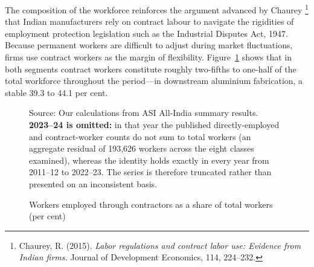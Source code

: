 \documentclass[11pt, a4paper]{article}
\numberwithin{figure}{section}
\numberwithin{table}{section}
\begin{document}
The composition of the workforce reinforces the argument advanced by Chaurey \cite{chaurey2015}\footnote{Chaurey, R. (2015). \textit{Labor regulations and contract labor use: Evidence from Indian firms.} Journal of Development Economics, 114, 224--232.} that Indian manufacturers rely on contract labour to navigate the rigidities of employment protection legislation such as the Industrial Disputes Act, 1947. Because permanent workers are difficult to adjust during market fluctuations, firms use contract workers as the margin of flexibility. Figure~\ref{fig:asi_contract} shows that in both segments contract workers constitute roughly two-fifths to one-half of the total workforce throughout the period---in downstream aluminium fabrication, a stable 39.3 to 44.1 per cent.

\begin{figure}[H]
    \centering
    \caption{Workers employed through contractors as a share of total workers (per cent)}
    \label{fig:asi_contract}
    \vspace{0.3cm}


    \vspace{0.2cm}
    \raggedright
    \small Source: Our calculations from ASI All-India summary results. \textbf{2023--24 is omitted:} in that year the published directly-employed and contract-worker counts do not sum to total workers (an aggregate residual of 193,626 workers across the eight classes examined), whereas the identity holds exactly in every year from 2011--12 to 2022--23. The series is therefore truncated rather than presented on an inconsistent basis.
\end{figure}
\end{document}
